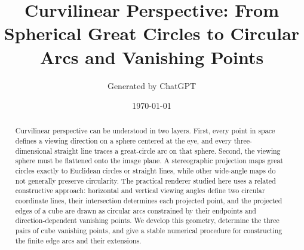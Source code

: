 \documentclass[aps,prb,reprint]{revtex4-1}
\begin{document}
\title{Curvilinear Perspective: From Spherical Great Circles to Circular Arcs and Vanishing Points}
\author{Generated by ChatGPT}
\date{\today}

\begin{abstract}
Curvilinear perspective can be understood in two layers.  First, every point in space defines a viewing direction on a sphere centered at the eye, and every three-dimensional straight line traces a great-circle arc on that sphere.  Second, the viewing sphere must be flattened onto the image plane.  A stereographic projection maps great circles exactly to Euclidean circles or straight lines, while other wide-angle maps do not generally preserve circularity.  The practical renderer studied here uses a related constructive approach: horizontal and vertical viewing angles define two circular coordinate lines, their intersection determines each projected point, and the projected edges of a cube are drawn as circular arcs constrained by their endpoints and direction-dependent vanishing points.  We develop this geometry, determine the three pairs of cube vanishing points, and give a stable numerical procedure for constructing the finite edge arcs and their extensions.
\end{abstract}

\maketitle







\end{document}
